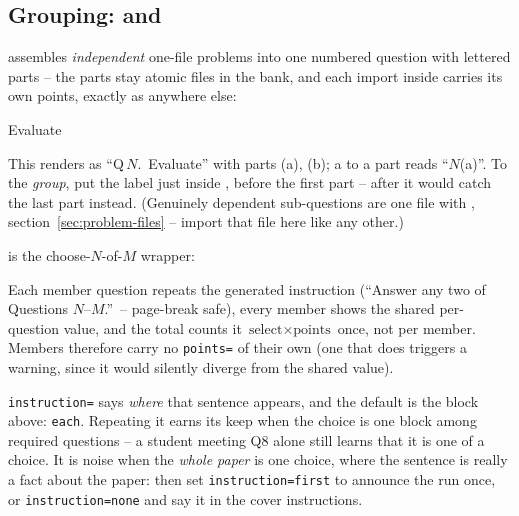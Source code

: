 \subsection{Grouping:  and }

 assembles \emph{independent} one-file problems into one
numbered question with lettered parts -- the parts stay atomic files in the
bank, and each import inside carries its own points, exactly as anywhere
else:

\begin{manexsource}
\begin{problemgroup}{Evaluate}
  \workspace[3]
  \workspace[2]
\end{problemgroup}
\end{manexsource}

This renders as ``Q\,$N$.\ Evaluate'' with parts (a), (b); a  to a
part reads ``$N$(a)''. To  the \emph{group}, put the label just
inside , before the first part -- after  it would
catch the last part instead. (Genuinely dependent sub-questions are one file
with , section~\ref{sec:problem-files} -- import that file here
like any other.)

 is the choose-$N$-of-$M$ wrapper:

\begin{manexsource}
\begin{problemchoice}[select=2, points=5]
  \FreshPage
  \FreshPage
\end{problemchoice}
\end{manexsource}

Each member question repeats the generated instruction (``Answer any two of
Questions $N$--$M$.''\ -- page-break safe), every member shows the shared
per-question value, and the total counts it $\text{select} \times
\text{points}$ once, not per member. Members therefore carry no
\texttt{points=} of their own (one that does triggers a warning, since it
would silently diverge from the shared value).

\texttt{instruction=} says \emph{where} that sentence appears, and the
default is the block above: \texttt{each}. Repeating it earns its keep when
the choice is one block among required questions -- a student meeting Q8
alone still learns that it is one of a choice. It is noise when the
\emph{whole paper} is one choice, where the sentence is really a fact about
the paper: then set \texttt{instruction=first} to announce the run once, or
\texttt{instruction=none} and say it in the cover instructions.


